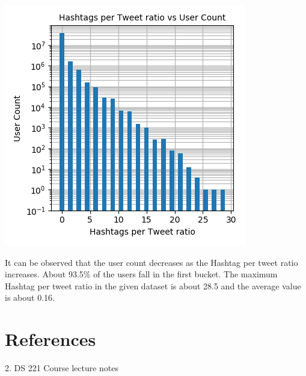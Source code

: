 \documentclass[11pt,a4paper,oneside]{article}
\begin{document}
    \begin{center}
    	\includegraphics[scale=0.6]{1.png}		
    \end{center}

	It can be observed that the user count decreases as the Hashtag per tweet ratio increases. About 93.5\% of the users fall in the first bucket. The maximum Hashtag per tweet ratio in the given dataset is about 28.5 and the average value is about 0.16.
    
    \section{References}
    \begin{list}{}{}
    	\item 2. DS 221 Course lecture notes
    \end{list}
    
\end{document}
